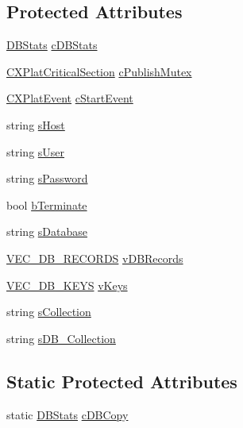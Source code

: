 \subsection*{\-Protected \-Attributes}
\begin{DoxyCompactItemize}
\item 
\hyperlink{class_d_b_stats}{\-D\-B\-Stats} \hyperlink{class_c_d_b_publisher_a6b1709641e8a184c32ce1776547c43ca}{c\-D\-B\-Stats}
\item 
\hyperlink{class_c_x_plat_critical_section}{\-C\-X\-Plat\-Critical\-Section} \hyperlink{class_c_d_b_publisher_adbf98e64ef485c1d32d758e3935f9746}{c\-Publish\-Mutex}
\item 
\hyperlink{class_c_x_plat_event}{\-C\-X\-Plat\-Event} \hyperlink{class_c_d_b_publisher_a09ae2e573252d271614d487a8db7313f}{c\-Start\-Event}
\item 
string \hyperlink{class_c_d_b_publisher_ab5978dae8e2b51382c7b754b00eb6f37}{s\-Host}
\item 
string \hyperlink{class_c_d_b_publisher_a70c6a70a3eac533267cd6c09d7e4cfe4}{s\-User}
\item 
string \hyperlink{class_c_d_b_publisher_af7857687fa866673f59598535a191139}{s\-Password}
\item 
bool \hyperlink{class_c_d_b_publisher_a067f21d227664a36fcccfba89a03b89c}{b\-Terminate}
\item 
string \hyperlink{class_c_d_b_publisher_ab5f77007ed9fe5e7dae2fc4adf5f3661}{s\-Database}
\item 
\hyperlink{_c_d_b_records_array_8h_a32e3940d41c32d8e161b8775f6c4296a}{\-V\-E\-C\-\_\-\-D\-B\-\_\-\-R\-E\-C\-O\-R\-D\-S} \hyperlink{class_c_d_b_publisher_af3c16b9ccfd3d1df26c1ebf91bd6a987}{v\-D\-B\-Records}
\item 
\hyperlink{_c_d_b_publisher_8h_a4663229004d120a06c202e46db5d2d4d}{\-V\-E\-C\-\_\-\-D\-B\-\_\-\-K\-E\-Y\-S} \hyperlink{class_c_d_b_publisher_a05607846e2fc5c63010536113ca2534e}{v\-Keys}
\item 
string \hyperlink{class_c_d_b_publisher_ac6db2d0df8562fa55c15d7aa5414e285}{s\-Collection}
\item 
string \hyperlink{class_c_d_b_publisher_a10c344b92ca8af51800352cdb99c47c6}{s\-D\-B\-\_\-\-Collection}
\end{DoxyCompactItemize}
\subsection*{\-Static \-Protected \-Attributes}
\begin{DoxyCompactItemize}
\item 
static \hyperlink{class_d_b_stats}{\-D\-B\-Stats} \hyperlink{class_c_d_b_publisher_a3a63670d4729d713995f05fd4a83a2ba}{c\-D\-B\-Copy}
\end{DoxyCompactItemize}


